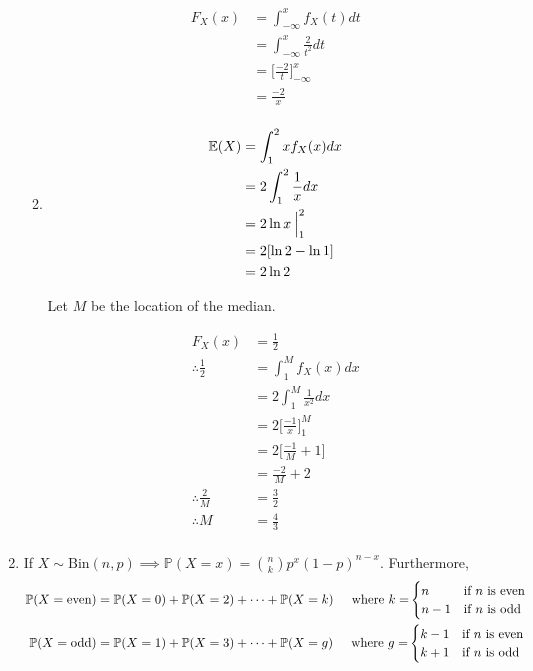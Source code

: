 \documentclass[a4paper]{article}
\newcommand{\p}{\mathbb{P}}
\newcommand{\e}{\mathbb{E}}
\newcommand{\ds}{\displaystyle}
\begin{document}
\begin{enumerate}
\begin{enumerate}
		\begin{align*}
			F_X(x) & = \int_{-\infty}^x f_X(t) dt \\
			& = \int_{-\infty}^x \frac{2}{t^2} dt \\
			& = \bigg[\frac{-2}{t} \bigg]_{-\infty}^x \\
			& = \frac{-2}{x} \\
		\end{align*}

		\item 

		\begin{align*}
			\e(X) & = \int_1^2 xf_X(x) dx \\
			& = 2 \int_1^2 \frac{1}{x} dx \\
			& = 2 \ln{x} \hspace{0.75mm} \Big|_1^2 \\
			& = 2 [\ln{2} - \ln{1}] \\
			& = 2\ln{2} \\
		\end{align*}

		Let $\ds{M}$ be the location of the median.

		\begin{align*}
			F_X(x) & = \frac{1}{2} \\
			\therefore \frac{1}{2} & = \int_1^M f_X(x) dx \\
			& = 2 \int_1^M \frac{1}{x^2} dx \\
			& = 2 \bigg[\frac{-1}{x} \bigg]_1^M \\
			& = 2 \bigg[\frac{-1}{M} + 1 \bigg] \\
			& = \frac{-2}{M} + 2 \\
			\therefore \frac{2}{M} & = \frac{3}{2} \\
			\therefore M & = \frac{4}{3} \\
		\end{align*}


	\end{enumerate}

	\bigbreak

	\item If $\ds{X \sim \text{Bin}(n,p) \implies \p(X=x) = \binom{n}{k} p^{x}(1-p)^{n-x}}$. Furthermore,
	\begin{align*}
		\p(X= \text{even}) & = \p(X=0) + \p(X=2) + \dots + \p(X=k) \hspace{5mm} \text{where $\ds{k =}$}
		\begin{cases}
			n & \text{if $\ds{n}$ is even} \\
			n - 1 & \text{if $\ds{n}$ is odd}
		\end{cases} \\
		\p(X= \text{odd}) & = \p(X=1) + \p(X=3) + \dots + \p(X=g) \hspace{5mm} \text{where $\ds{g =}$}
		\begin{cases}
			k - 1 & \text{if $\ds{n}$ is even} \\
			k + 1 & \text{if $\ds{n}$ is odd}
		\end{cases} \\
	\end{align*}


\end{enumerate}
\end{document}
